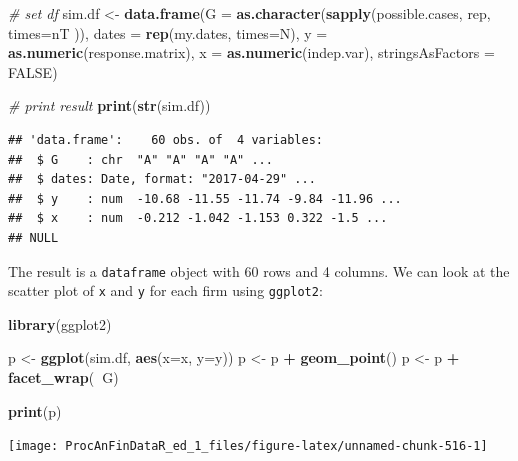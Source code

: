 \documentclass[11pt,]{book}
\newenvironment{Shaded}{\begin{snugshade}}{\end{snugshade}}
\newcommand{\KeywordTok}[1]{\textcolor[rgb]{0.27,0.27,0.27}{\textbf{#1}}}
\newcommand{\DataTypeTok}[1]{\textcolor[rgb]{0.27,0.27,0.27}{#1}}
\newcommand{\StringTok}[1]{\textcolor[rgb]{0.5,0.5,0.5}{#1}}
\newcommand{\CommentTok}[1]{\textcolor[rgb]{0.56,0.35,0.01}{\textit{#1}}}
\newcommand{\OtherTok}[1]{\textcolor[rgb]{0.56,0.35,0.01}{#1}}
\newcommand{\OperatorTok}[1]{\textcolor[rgb]{0.81,0.36,0.00}{\textbf{#1}}}
\newcommand{\NormalTok}[1]{#1}
\begin{document}
\begin{Shaded}
\begin{Highlighting}[]
\CommentTok{# set df}
\NormalTok{sim.df <-}\StringTok{ }\KeywordTok{data.frame}\NormalTok{(}\DataTypeTok{G =} \KeywordTok{as.character}\NormalTok{(}\KeywordTok{sapply}\NormalTok{(possible.cases, }
\NormalTok{                                             rep, }
                                             \DataTypeTok{times=}\NormalTok{nT )),}
                     \DataTypeTok{dates =} \KeywordTok{rep}\NormalTok{(my.dates, }\DataTypeTok{times=}\NormalTok{N),}
                     \DataTypeTok{y =} \KeywordTok{as.numeric}\NormalTok{(response.matrix),}
                     \DataTypeTok{x =} \KeywordTok{as.numeric}\NormalTok{(indep.var), }
                     \DataTypeTok{stringsAsFactors =} \OtherTok{FALSE}\NormalTok{)}

\CommentTok{# print result}
\KeywordTok{print}\NormalTok{(}\KeywordTok{str}\NormalTok{(sim.df))}
\end{Highlighting}
\end{Shaded}

\begin{verbatim}
## 'data.frame':    60 obs. of  4 variables:
##  $ G    : chr  "A" "A" "A" "A" ...
##  $ dates: Date, format: "2017-04-29" ...
##  $ y    : num  -10.68 -11.55 -11.74 -9.84 -11.96 ...
##  $ x    : num  -0.212 -1.042 -1.153 0.322 -1.5 ...
## NULL
\end{verbatim}

The result is a \texttt{dataframe} object with 60 rows and 4 columns. We
can look at the scatter plot of \texttt{x} and \texttt{y} for each firm
using \texttt{ggplot2}:

\begin{Shaded}
\begin{Highlighting}[]
\KeywordTok{library}\NormalTok{(ggplot2)}

\NormalTok{p <-}\StringTok{ }\KeywordTok{ggplot}\NormalTok{(sim.df, }\KeywordTok{aes}\NormalTok{(}\DataTypeTok{x=}\NormalTok{x, }\DataTypeTok{y=}\NormalTok{y))}
\NormalTok{p <-}\StringTok{ }\NormalTok{p }\OperatorTok{+}\StringTok{ }\KeywordTok{geom_point}\NormalTok{()}
\NormalTok{p <-}\StringTok{ }\NormalTok{p }\OperatorTok{+}\StringTok{ }\KeywordTok{facet_wrap}\NormalTok{(}\OperatorTok{~}\NormalTok{G)}

\KeywordTok{print}\NormalTok{(p)}
\end{Highlighting}
\end{Shaded}

\begin{center}\texttt{[image: ProcAnFinDataR\_ed\_1\_files/figure-latex/unnamed-chunk-516-1]} \end{center}
\end{document}
